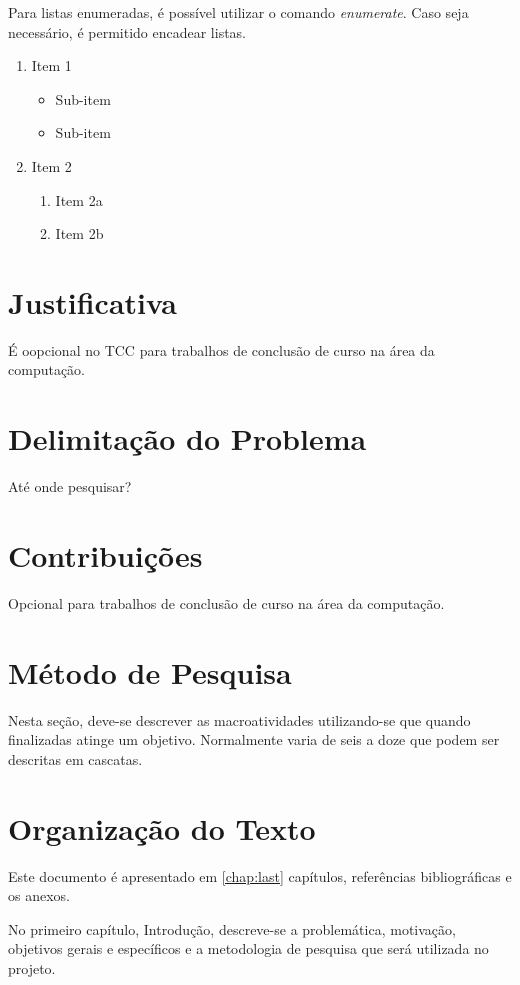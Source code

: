 Para listas enumeradas, é possível utilizar o comando \emph{enumerate}. Caso seja necessário, é permitido encadear listas.

\begin{enumerate}
    \item Item 1
    \begin{itemize}
        \item Sub-item
        \item Sub-item
    \end{itemize}
    \item Item 2
    \begin{enumerate}
        \item Item 2a
        \item Item 2b
    \end{enumerate}
\end{enumerate}

\section{Justificativa}
É oopcional no TCC para trabalhos de conclusão de curso na área da computação.

\section{Delimitação do Problema}
Até onde pesquisar?

\section{Contribuições}
Opcional para trabalhos de conclusão de curso na área da computação.

\section{Método de Pesquisa}
\label{metodo-pesquisa}
Nesta seção, deve-se descrever as macroatividades utilizando-se que quando finalizadas atinge um objetivo. Normalmente varia de seis a doze que podem ser descritas em cascatas. 

\section{Organização do Texto}
Este documento é apresentado em \ref{chap:last} capítulos, referências bibliográficas e os anexos.

No primeiro capítulo, Introdução, descreve-se a problemática, motivação, objetivos gerais e específicos e a metodologia de pesquisa que será utilizada no projeto. 

